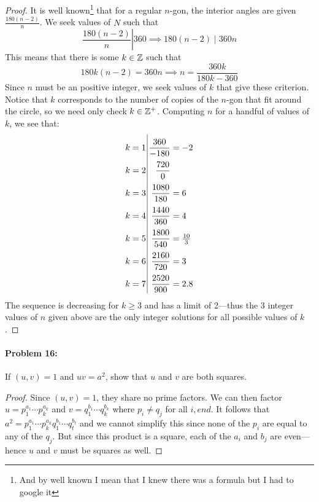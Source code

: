 \begin{proof}
  It is well known\footnote{And by well known I mean that I knew there was a
    formula but I had to google it}
  that for a regular \(n\)-gon, the interior
  angles are given \(\frac{180(n-2)}{n}\). We seek values of \(N\) such that
  \[
    \left. \frac{180(n-2)}{n} \right| 360 \implies 180(n-2) \mid 360n
  \]
  This means that there is some \(k \in \mathbb{Z} \) such that
  \[
    180k(n-2) = 360n  \implies n = \frac{360k}{180k-360}
  \]
  Since \(n\) must be an positive integer, we seek values of \(k\) that give
  these criterion. Notice that \(k\) corresponds to the number of copies of the
  \(n\)-gon that fit around the circle, so we need only check \(k \in \mathbb{Z} ^+\).
  Computing \(n\) for a handful of values of \(k\), we see that:
  \[\arraycolsep=1.4pt\def\arraystretch{2.2}
    \begin{array}{c|rl}
    k=1 & \dfrac{360}{-180} &= -2 \\
    k=2 & \dfrac{720}{0} \\
    k=3 & \dfrac{1080}{180} &= 6\\
    k=4 & \dfrac{1440}{360} &= 4 \\
    k=5 & \dfrac{1800}{540} &= \frac{10}{3} \\
    k=6 & \dfrac{2160}{720} &= 3 \\
    k=7 & \dfrac{2520}{900} &= 2.8 \\
    \end{array}
    \]
    The sequence is decreasing for \(k\geq 3\) and has a limit of 2---thus the 3
    integer values of \(n\) given above are the only integer solutions for all
    possible values of \(k\).
\end{proof}

\paragraph{Problem 16:} If \((u,v)=1\) and \(uv=a^2\), show that \(u\) and \(v\)
are both squares.

\begin{proof}
  Since \((u,v)=1\), they share no prime factors. We can then factor
  \(u=p_1^{a_1}\cdots p_k^{a_k}\) and \(v=q_1^{b_1}\cdots q_k^{b_k}\) where
  \(p_i\neq q_j\) for all \(i,end\). It follows that
  \(a^2=p_1^{a_1}\cdots p_k^{a_k}q_1^{b_1}\cdots q_t^{b_t}\) and we cannot
  simplify this since none of the \(p_i\) are equal to any of the \(q_j\). But
  since this product is a square, each of the \(a_i\) and \(b_j\) are
  even---hence \(u\) and \(v\) must be squares as well.
\end{proof}
